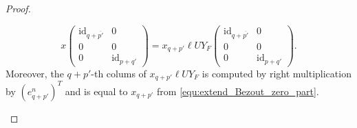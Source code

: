 \documentclass[10pt]{article}
\newcommand\id[1]{\text{id}_{#1}}
\begin{document}
\begin{proof}
\begin{enumerate}
\begin{equation}
      x\begin{pmatrix}
      \id{q+\overline{p'}} & 0\\
      0 & 0\\
      0 & \id{p+q'}
      \end{pmatrix}=x_{q+p'}\ell UY_F\begin{pmatrix}
      \id{q+\overline{p'}} & 0\\
      0 & 0\\
      0 & \id{p+q'}
      \end{pmatrix}.
    \end{equation}
    Moreover, the $q+p'$-th colums of $x_{q+p'}\ell UY_F$ is computed
    by right multiplication by $(e^n_{q+p'})^T$ and is equal to
    $x_{q+p'}$ from \eqref{equ:extend_Bezout_zero_part}.
  \end{enumerate}
\end{proof}
\end{document}
